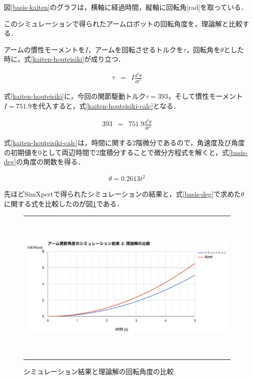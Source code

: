 図\ref{basis-kaiten}のグラフは，横軸に経過時間，縦軸に回転角{[}rad{]}を取っている．

このシミュレーションで得られたアームロボットの回転角度を，理論解と比較する．

アームの慣性モーメントを\(I\)，アームを回転させるトルクを\(\tau\)，回転角を\(\theta\)とした時に，式\ref{kaiten-houteisiki}が成り立つ．

\begin{eqnarray}
  \tau &=& I \frac{d^2 \theta}{d t^2}
  \label{kaiten-houteisiki}
\end{eqnarray}

式\ref{kaiten-houteisiki}に，今回の関節駆動トルク\(\tau=393\)，そして慣性モーメント\(I=751.9\)を代入すると，式\ref{kaiten-houteisiki-calc}となる．

\begin{eqnarray}
  393 &=& 751.9 \frac{d^2 \theta}{d t^2}
  \label{kaiten-houteisiki-calc}
\end{eqnarray}

式\ref{kaiten-houteisiki-calc}は，時間に関する2階微分であるので，角速度及び角度の初期値を0として両辺時間で2度積分することで微分方程式を解くと，式\ref{basis-deg}の角度の関数を得る．

\begin{eqnarray}
  \theta = 0.2613t^2
  \label{basis-deg}
\end{eqnarray}

先ほどSimXpertで得られたシミュレーションの結果と，式\ref{basis-deg}で求めた\(\theta\)に関する式を比較したのが図\ref{compare}である．

\begin{figure}[htbp]
  \begin{center}
    \begin{tabular}{c}
      \includegraphics[height=7.5cm]{img/eps/compare.eps}
    \end{tabular}
    \caption{シミュレーション結果と理論解の回転角度の比較}
    \label{compare}
  \end{center}
\end{figure}

